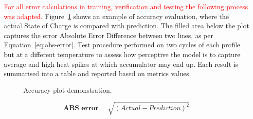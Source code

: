 %
\textcolor{red}{For all error calculations in training, verification and testing the following process was adapted.}
Figure~\ref{fig:plot_demo} shows an example of accuracy evaluation, where the actual State of Charge is compared with prediction.
The filled area below the plot captures the error Absolute Error Difference between two lines, as per Equation~\ref{eq:abs-error}.
Test procedure performed on two cycles of each profile but at a different temperature to assess how perceptive the model is to capture average and high heat spikes at which accumulator may end up.
Each result is summarised into a table and reported based on metrics values.
\begin{figure}[ht]
    \centering
    
    \caption{Accuracy plot demonstration.}
    \label{fig:plot_demo}
\end{figure}
\begin{equation}
    \textbf{ABS error}  = \sqrt{(Actual-Prediction)^2}
    \label{eq:abs-error}
\end{equation}
%
%
%

